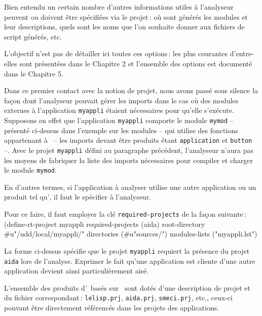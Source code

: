 Bien entendu un certain nombre d'autres informations utiles
\`{a} l'analyseur peuvent ou doivent \^{e}tre sp\'{e}cifi\'{e}es via le projet\,:
o\`{u} sont g\'{e}n\'{e}r\'{e}s les modules et leur descriptions, quels sont
les noms que l'on souhaite donner aux fichiers de script g\'{e}n\'{e}r\'{e}s,
etc.

L'objectif n'est pas de d\'{e}tailler ici toutes ces options\,:
les plus courantes d'entre-elles sont pr\'{e}sent\'{e}es dans le
Chapitre 2 et l'ensemble des options est document\'{e}
dans le Chapitre 5.




Dans ce premier contact avec la notion de projet,
nous avons pass\'{e} sous silence la fa\c{c}on dont
l'analyseur pouvait g\'{e}rer les imports dans le cas o\`{u} des
modules externes \`{a} l'application {\tt myappli} \'{e}taient
n\'{e}cessaires pour qu'elle s'ex\'{e}cute.
Supposons en effet que l'application {\tt myappli} comporte
le module {\tt mymod} -- pr\'{e}sent\'{e} ci-dessus dans l'exemple
sur les modules -- qui utilise des fonctions appartenant
\`{a} \Aida\ -- les imports devant \^{e}tre produits \'{e}tant
{\tt application} et {\tt button} --.
Avec le projet {\tt myappli} d\'{e}fini
au paragraphe pr\'{e}c\'{e}dent, l'analyseur n'aura pas les
moyens de fabriquer la liste des imports n\'{e}cessaires pour
compiler et charger le module {\tt mymod}.

En d'autres termes, si l'application \`{a} analyser utilise
une autre application ou un produit tel qu'\Aida, il faut le
sp\'{e}cifier \`{a} l'analyseur.

Pour ce faire, il faut employer la cl\'{e} {\tt required-projects}
de la fa\c{c}on suivante\,:
\BeginLL
(define-rt-project myappli
   required-projects (aida)
   root-directory #u"/udd/local/myappli/" 
   directories (#u"sources/")
   modules-lists ("myappli.lst") 
\EndLL

La forme ci-dessus sp\'{e}cifie que le projet {\tt myappli} 
requiert la pr\'{e}sence du projet {\tt aida} lors de l'analyse. 
Exprimer le fait qu'une application est cliente d'une autre
application devient ainsi particuli\`{e}rement ais\'{e}.

L'ensemble des produits d'\Ilog\ bas\'{e}s sur \LeLisp\ sont dot\'{e}s
d'une description de projet et du fichier correspondant\,: 
{\tt lelisp.prj},
{\tt aida.prj},
{\tt smeci.prj},
etc.,
ceux-ci pouvant \^{e}tre directement r\'{e}f\'{e}renc\'{e}s
dans les projets des applications.



